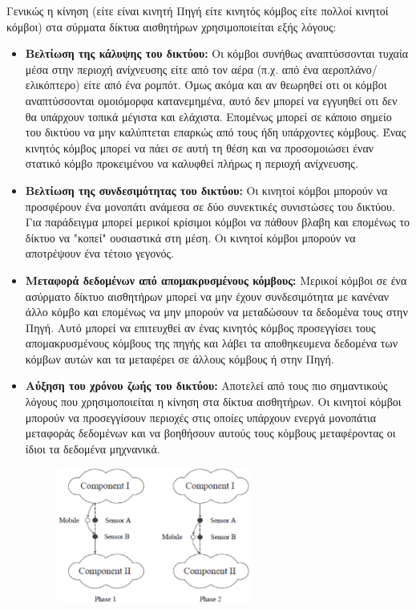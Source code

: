 Γενικώς η κίνηση (είτε είναι κινητή Πηγή είτε κινητός κόμβος είτε πολλοί κινητοί κόμβοι) στα σύρματα δίκτυα αισθητήρων χρησιμοποιείται εξής λόγους:

\begin{itemize}
\item \textbf{Βελτίωση της κάλυψης του δικτύου:} Οι κόμβοι συνήθως αναπτύσσονται τυχαία μέσα στην περιοχή ανίχνευσης είτε από τον αέρα (π.χ. από ένα
αεροπλάνο/ελικόπτερο) είτε από ένα ρομπότ. Όμως ακόμα και αν θεωρηθεί οτι οι κόμβοι αναπτύσσονται ομοιόμορφα κατανεμημένα, αυτό δεν μπορεί να εγγυηθεί οτι δεν θα
υπάρχουν τοπικά μέγιστα και ελάχιστα. Επομένως μπορεί σε κάποιο σημείο του δικτύου να μην καλύπτεται επαρκώς από τους ήδη υπάρχοντες κόμβους. Ένας κινητός κόμβος
μπορεί να πάει σε αυτή τη θέση και να προσομοιώσει έναν στατικό κόμβο προκειμένου να καλυφθεί πλήρως η περιοχή ανίχνευσης.
\item \textbf{Βελτίωση της συνδεσιμότητας του δικτύου:} Οι κινητοί κόμβοι μπορούν να προσφέρουν ένα μονοπάτι ανάμεσα σε δύο συνεκτικές συνιστώσες του δικτύου. Για
παράδειγμα μπορεί μερικοί κρίσιμοι κόμβοι να πάθουν βλαβη και επομένως το δίκτυο να "κοπεί" ουσιαστικά στη μέση. Οι κινητοί κόμβοι μπορούν να αποτρέψουν ένα τέτοιο
γεγονός.
\item \textbf{Μεταφορά δεδομένων από απομακρυσμένους κόμβους:} Μερικοί κόμβοι σε ένα ασύρματο δίκτυο αισθητήρων μπορεί να μην έχουν συνδεσιμότητα με κανέναν άλλο
κόμβο και επομένως να μην μπορούν να μεταδώσουν τα δεδομένα τους στην Πηγή. Αυτό μπορεί να επιτευχθεί αν ένας κινητός κόμβος προσεγγίσει τους απομακρυσμένους κόμβους
της πηγής και λάβει τα αποθηκευμενα δεδομένα των κόμβων αυτών και τα μεταφέρει σε άλλους κόμβους ή στην Πηγή.
\item \textbf{Αύξηση του χρόνου ζωής του δικτύου:} Αποτελεί από τους πιο σημαντικούς λόγους που χρησιμοποιείται η κίνηση στα δίκτυα αισθητήρων. Οι κινητοί κόμβοι
μπορούν να προσεγγίσουν περιοχές στις οποίες υπάρχουν ενεργά μονοπάτια μεταφοράς δεδομένων και να βοηθήσουν αυτούς τους κόμβους μεταφέροντας οι ίδιοι τα δεδομένα
μηχνανικά.
\begin{figure}[h]
	\centering
	\includegraphics[width=0.6\textwidth]{images/mobile_help.eps}

\end{figure}
\end{itemize}
